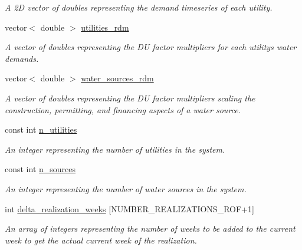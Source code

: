 \begin{DoxyCompactItemize}
\begin{DoxyCompactList}\small\item\em A 2D vector of doubles representing the demand timeseries of each utility. \end{DoxyCompactList}\item 
vector$<$ double $>$ \mbox{\hyperlink{classContinuityModel_aa4a00b76da6295d2faa11e3dcaea1896}{utilities\+\_\+rdm}}
\begin{DoxyCompactList}\small\item\em A vector of doubles representing the DU factor multipliers for each utility\textquotesingle{}s water demands. \end{DoxyCompactList}\item 
vector$<$ double $>$ \mbox{\hyperlink{classContinuityModel_ab7b8fa93a6f56b328e425e1ead6cfefa}{water\+\_\+sources\+\_\+rdm}}
\begin{DoxyCompactList}\small\item\em A vector of doubles representing the DU factor multipliers scaling the construction, permitting, and financing aspects of a water source. \end{DoxyCompactList}\item 
const int \mbox{\hyperlink{classContinuityModel_a6df6198ebc99a099df08f4b8ce6b52b9}{n\+\_\+utilities}}
\begin{DoxyCompactList}\small\item\em An integer representing the number of utilities in the system. \end{DoxyCompactList}\item 
const int \mbox{\hyperlink{classContinuityModel_a3c25a0d17579eb0fdad0b18319441460}{n\+\_\+sources}}
\begin{DoxyCompactList}\small\item\em An integer representing the number of water sources in the system. \end{DoxyCompactList}\item 
int \mbox{\hyperlink{classContinuityModel_aee4088e422a0d3723dc7895c96c9ebe3}{delta\+\_\+realization\+\_\+weeks}} \mbox{[}N\+U\+M\+B\+E\+R\+\_\+\+R\+E\+A\+L\+I\+Z\+A\+T\+I\+O\+N\+S\+\_\+\+R\+OF+1\mbox{]}
\begin{DoxyCompactList}\small\item\em An array of integers representing the number of weeks to be added to the current week to get the actual current week of the realization. \end{DoxyCompactList}\end{DoxyCompactItemize}


